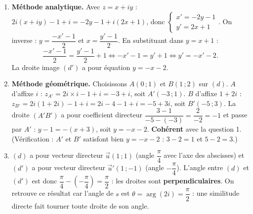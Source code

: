 \documentclass[11pt]{article}
\begin{document}
\begin{corrige}
\begin{enumerate}
\item \textbf{Méthode analytique.} Avec $z = x + iy$ : $2i(x+iy) - 1 + i = -2y - 1 + i(2x + 1)$, donc $\begin{cases} x' = -2y - 1 \\ y' = 2x + 1 \end{cases}$. On inverse : $y = \dfrac{-x' - 1}{2}$ et $x = \dfrac{y' - 1}{2}$. En substituant dans $y = x + 1$ :
\[ \frac{-x'-1}{2} = \frac{y'-1}{2} + 1 \iff -x' - 1 = y' + 1 \iff y' = -x' - 2. \]
La droite image $(d')$ a pour équation $y = -x - 2$.
\item \textbf{Méthode géométrique.} Choisissons $A(0\,;1)$ et $B(1\,;2)$ sur $(d)$.
$A$ d'affixe $i$ : $z_{A'} = 2i \times i - 1 + i = -3 + i$, soit $A'(-3\,;1)$.
$B$ d'affixe $1 + 2i$ : $z_{B'} = 2i(1+2i) - 1 + i = 2i - 4 - 1 + i = -5 + 3i$, soit $B'(-5\,;3)$.
La droite $(A'B')$ a pour coefficient directeur $\dfrac{3-1}{-5-(-3)} = \dfrac{2}{-2} = -1$ et passe par $A'$ : $y - 1 = -(x + 3)$, soit $y = -x - 2$. \textbf{Cohérent} avec la question 1. (Vérification : $A'$ et $B'$ satisfont bien $y = -x-2$ : $3 - 2 = 1$ et $5 - 2 = 3$.)
\item $(d)$ a pour vecteur directeur $\vec{u}(1\,;1)$ (angle $\dfrac{\pi}{4}$ avec l'axe des abscisses) et $(d')$ a pour vecteur directeur $\vec{u}'(1\,;-1)$ (angle $-\dfrac{\pi}{4}$). L'angle entre $(d)$ et $(d')$ est donc $\dfrac{\pi}{4} - \left(-\dfrac{\pi}{4}\right) = \dfrac{\pi}{2}$ : les droites sont \textbf{perpendiculaires}. On retrouve ce résultat car l'angle de $s$ est $\theta = \arg(2i) = \dfrac{\pi}{2}$ : une similitude directe fait tourner toute droite de son angle.
\end{enumerate}
\end{corrige}
\end{document}
